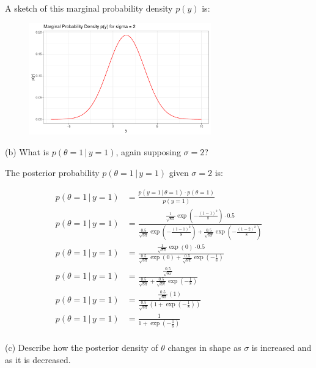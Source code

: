 \documentclass[12pt]{article}
\begin{document}
A sketch of this marginal probability density $p(y)$ is:

\begin{figure}[h]
    \centering
    \includegraphics[width=0.7\textwidth]{q1a_plot.pdf}
\end{figure}
\pagebreak

(b) What is $p(\theta = 1 \, | \, y = 1)$, again supposing $\sigma = 2$?

The posterior probability $p(\theta = 1 \, | \, y = 1)$ given $\sigma = 2$ is:

\begin{align*}
p(\theta = 1 \, | \, y = 1) &= \frac{p(y = 1 \, | \, \theta = 1) \cdot p(\theta = 1)}{p(y = 1)} \\
p(\theta = 1 \, | \, y = 1) &= \frac{\frac{1}{\sqrt{8\pi}} \exp\left( -\frac{(1-1)^2}{8}\right) \cdot 0.5}{\frac{0.5}{\sqrt{8\pi}} \exp\left( -\frac{(1-1)^2}{8} \right) + \frac{0.5}{\sqrt{8\pi}} \exp\left( -\frac{(1-2)^2}{8} \right)} \\
p(\theta = 1 \, | \, y = 1) &= \frac{\frac{1}{\sqrt{8\pi}} \exp\left( 0\right) \cdot 0.5}{\frac{0.5}{\sqrt{8\pi}} \exp\left( 0 \right) + \frac{0.5}{\sqrt{8\pi}} \exp\left( -\frac{1}{8} \right)} \\
p(\theta = 1 \, | \, y = 1) &= \frac{\frac{0.5}{\sqrt{8\pi}}}{\frac{0.5}{\sqrt{8\pi}} + \frac{0.5}{\sqrt{8\pi}} \exp\left( -\frac{1}{8} \right)} \\
p(\theta = 1 \, | \, y = 1) &= \frac{\frac{0.5}{\sqrt{8\pi}}\left(1\right)}{\frac{0.5}{\sqrt{8\pi}}\left(1 + \exp\left( -\frac{1}{8} \right)\right) } \\
p(\theta = 1 \, | \, y = 1) &= \frac{1}{1 + \exp\left( -\frac{1}{8} \right)} \\
\end{align*}



(c) Describe how the posterior density of $\theta$ changes in shape as $\sigma$ is increased and as it is decreased.
\end{document}
